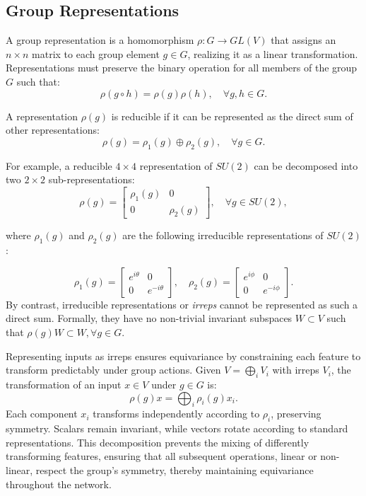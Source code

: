 \subsection{Group Representations}
\label{sec:group_representations}
A group representation is a homomorphism  \(\rho: G \to GL(V)\) that assigns an \(n \times n\) matrix to each group element \(g \in G\), realizing it as a linear transformation. Representations must preserve the binary operation for all members of the group \(G\) such that:
\[
\rho(g \circ h) = \rho(g) \rho (h), \quad \forall g,h \in G.
\]

A representation \(\rho(g)\) is reducible if it can be represented as the direct sum of other representations:
\[
\rho(g) = \rho_1(g) \oplus \rho_2(g), \quad \forall g \in G.
\]

For example, a reducible \(4 \times 4\) representation of \(SU(2)\) can be decomposed into two \(2 \times 2\) sub-representations:
\[
\rho(g) =
\begin{bmatrix}
\rho_1(g) & 0 \\
0 & \rho_2(g)
\end{bmatrix}, \quad \forall g \in SU(2),
\]

where \(\rho_1(g)\) and \(\rho_2(g)\) are the following irreducible representations of \(SU(2)\):

\[
\rho_1(g) =
\begin{bmatrix}
e^{i\theta} & 0 \\
0 & e^{-i\theta}
\end{bmatrix}, \quad
\rho_2(g) =
\begin{bmatrix}
e^{i\phi} & 0 \\
0 & e^{-i\phi}
\end{bmatrix}.
\]
By contrast, irreducible representations or \textit{irreps} cannot be represented as such a direct sum. Formally, they have no non-trivial invariant subspaces \(W \subset V\) such that \(\rho(g)W \subset W, \forall g \in G\).

Representing inputs as irreps ensures equivariance by constraining each feature to transform predictably under group actions. Given \( V = \bigoplus_{i} V_i \) with irreps \( V_i \), the transformation of an input \( x \in V \) under \( g \in G \) is:  
\[
\rho(g)x = \bigoplus_{i} \rho_i(g)x_i.
\]  
Each component \( x_i \) transforms independently according to \(\rho_i\), preserving symmetry. Scalars remain invariant, while vectors rotate according to standard representations. This decomposition prevents the mixing of differently transforming features, ensuring that all subsequent operations, linear or non-linear, respect the group’s symmetry, thereby maintaining equivariance throughout the network.

